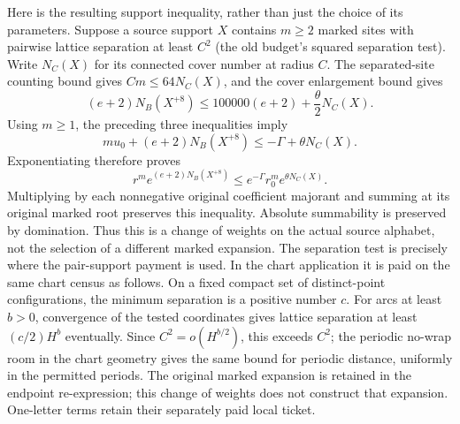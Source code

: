 Here is the resulting support inequality, rather than just the choice
of its parameters. Suppose a source support $X$ contains $m\ge2$
marked sites with pairwise lattice separation at least $C^2$ (the
old budget's squared separation test). Write $N_C(X)$ for its
connected cover number at radius $C$. The separated-site counting
bound gives $Cm\le64N_C(X)$, and the cover enlargement bound gives
\[
 (e+2)N_B(X^{+8})\le100000(e+2)+\frac\theta2N_C(X).
\]
Using $m\ge1$, the preceding three inequalities imply
\[
 m u_0+(e+2)N_B(X^{+8})
       \le-\Gamma+\theta N_C(X).
\]
Exponentiating therefore proves
\begin{equation}\label{eq:trace-endpoint-marked-budget}
 r^m e^{(e+2)N_B(X^{+8})}
 \le e^{-\Gamma}r_0^m e^{\theta N_C(X)}.
\end{equation}
Multiplying by each nonnegative original coefficient majorant and
summing at its original marked root preserves this inequality.
Absolute summability is preserved by domination. Thus this is a
change of weights on the actual source alphabet, not the selection
of a different marked expansion. The separation test is precisely
where the pair-support payment is used. In the chart application it
is paid on the same chart census as follows. On a fixed compact
set of distinct-point configurations, the minimum separation is a
positive number $c$. For arcs at least $b>0$, convergence of the
tested coordinates gives lattice separation at least
$(c/2)H^b$ eventually. Since $C^2=o(H^{b/2})$, this exceeds $C^2$;
the periodic no-wrap room in the chart geometry gives the same
bound for periodic distance, uniformly in the permitted periods.
The original marked expansion is retained in the endpoint
re-expression; this change of weights does not construct that
expansion. One-letter terms retain
their separately paid local ticket.

